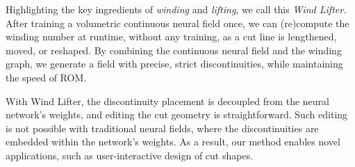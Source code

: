 Highlighting the key ingredients of \emph{winding} and \emph{lifting}, we call this \emph{Wind Lifter.} After training a volumetric continuous neural field once, we can (re)compute the winding number at runtime, without any training, as a cut line is lengthened, moved, or reshaped. By combining the continuous neural field and the winding graph, we generate a field with precise, strict discontinuities, while maintaining the speed of ROM. 







With Wind Lifter, the discontinuity placement is decoupled from the neural network's weights, and editing the cut geometry is straightforward. Such editing is not possible with traditional neural fields, where the discontinuities are embedded within the network's weights. As a result, our method enables novel applications, such as user-interactive design of cut shapes. 


